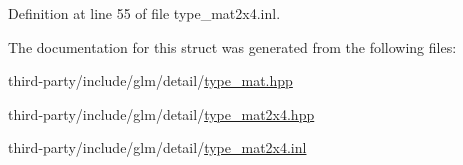 Definition at line 55 of file type\+\_\+mat2x4.\+inl.



The documentation for this struct was generated from the following files\+:\begin{DoxyCompactItemize}
\item 
third-\/party/include/glm/detail/\hyperlink{type__mat_8hpp}{type\+\_\+mat.\+hpp}\item 
third-\/party/include/glm/detail/\hyperlink{type__mat2x4_8hpp}{type\+\_\+mat2x4.\+hpp}\item 
third-\/party/include/glm/detail/\hyperlink{type__mat2x4_8inl}{type\+\_\+mat2x4.\+inl}\end{DoxyCompactItemize}
